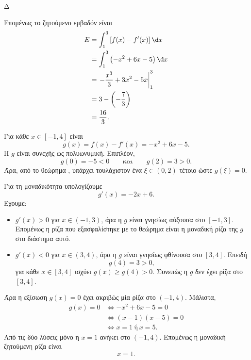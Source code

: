 \begin{thema}{Δ}
\begin{erwthma}
\begin{center}
\end{center}

Επομένως το ζητούμενο εμβαδόν είναι
\begin{align*}
E
&=\int_1^3\left[f(x)-f'(x)\right]\d x\\
&=\int_1^3\left(-x^2+6x-5\right)\d x\\
&=\left.-\frac{x^3}{3}+3x^2-5x\right|_1^3\\
&=3-\left(-\frac{7}{3}\right)\\
&={\frac{16}{3}}.
\end{align*}

\item Για κάθε $x\in[-1,4]$ είναι
\[
g(x)=f(x)-f'(x)=-x^2+6x-5.
\]
Η $g$ είναι συνεχής ως πολυωνυμική. Επιπλέον,
\[
g(0)=-5<0
\qquad\text{και}\qquad
g(2)=3>0.
\]
Άρα, από το θεώρημα , υπάρχει τουλάχιστον ένα
$\xi\in(0,2)$ τέτοιο ώστε $g(\xi)=0$.

Για τη μοναδικότητα υπολογίζουμε
\[
g'(x)=-2x+6.
\]
Έχουμε:
\begin{itemize}
\item $g'(x)>0$ για $x\in(-1,3)$, άρα η $g$ είναι γνησίως αύξουσα
στο $[-1,3]$. Επομένως η ρίζα που εξασφαλίστηκε με το θεώρημα
 είναι η μοναδική ρίζα της $g$ στο διάστημα αυτό.

\item $g'(x)<0$ για $x\in(3,4)$, άρα η $g$ είναι γνησίως φθίνουσα
στο $[3,4]$. Επειδή
\[
g(4)=3>0,
\]
για κάθε $x\in[3,4]$ ισχύει $g(x)\geq g(4)>0$. Συνεπώς η $g$ δεν
έχει ρίζα στο $[3,4]$.
\end{itemize}

Άρα η εξίσωση $g(x)=0$ έχει ακριβώς μία ρίζα στο $(-1,4)$.
Μάλιστα,
\begin{align*}
g(x)=0
&\Leftrightarrow -x^2+6x-5=0\\
&\Leftrightarrow (x-1)(x-5)=0\\
&\Leftrightarrow x=1\ \text{ή}\ x=5.
\end{align*}
Από τις δύο λύσεις μόνο η $x=1$ ανήκει στο $(-1,4)$. Επομένως η
μοναδική ζητούμενη ρίζα είναι
\[
{x=1}.
\]
\end{erwthma}
\end{thema}

